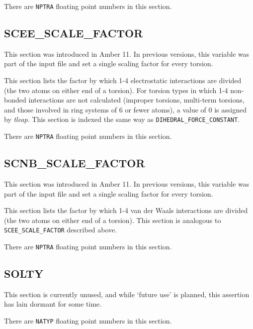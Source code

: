 
\noindent There are {\tt NPTRA} floating point numbers in this section.

\subsection*{SCEE\_SCALE\_FACTOR}

This section was introduced in Amber 11. In previous versions, this variable was
part of the input file and set a single scaling factor for every torsion.

This section lists the factor by which 1-4 electrostatic interactions are
divided (\ie the two atoms on either end of a torsion). For torsion types in
which 1-4 non-bonded interactions are not calculated (\eg improper torsions,
multi-term torsions, and those involved in ring systems of 6 or fewer atoms), a
value of 0 is assigned by \emph{tleap}. This section is indexed the same way as
{\tt DIHEDRAL\_FORCE\_CONSTANT}.


\noindent There are {\tt NPTRA} floating point numbers in this section.

\subsection*{SCNB\_SCALE\_FACTOR}

This section was introduced in Amber 11. In previous versions, this variable was
part of the input file and set a single scaling factor for every torsion.

This section lists the factor by which 1-4 van der Waals interactions are
divided (\ie the two atoms on either end of a torsion). This section is
analogous to {\tt SCEE\_SCALE\_FACTOR} described above.


\noindent There are {\tt NPTRA} floating point numbers in this section.

\subsection*{SOLTY}

This section is currently unused, and while `future use' is planned, this
assertion has lain dormant for some time.


\noindent There are {\tt NATYP} floating point numbers in this section.


